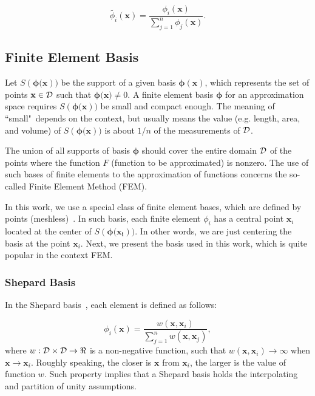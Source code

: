 \begin{equation}
\label{e.normalization}
	\tilde{\phi_i}(\textbf{x})=\frac{\phi_i(\textbf{x})}{\sum_{j=1}^n\phi_j(\textbf{x})}.
\end{equation}

\subsection{Finite Element Basis}
\label{ss.basis}

Let $S(\mathbf{\phi(\textbf{x}}))$ be the support of a given basis $\mathbf{\phi(\textbf{x})}$, which represents the set of points $\textbf{x}\in{\cal D}$ such that $\mathbf{\phi(\textbf{x}})\neq 0$. A finite element basis $\mathbf{\phi}$ for an approximation space requires $S(\mathbf{\phi(\textbf{x}}))$ be small and compact enough. The meaning of ``small"\ depends on the context, but usually means the value (e.g. length, area, and volume) of $S(\mathbf{\phi(\textbf{x}}))$ is about $1/n$ of the measurements of ${\cal D}$.

The union of all supports of basis $\mathbf{\phi}$ should cover the entire domain ${\cal D}$ of the points where the function $F$ (function to be approximated) is nonzero. The use of such bases of finite elements to the approximation of functions concerns the so-called Finite Element Method (FEM).

In this work, we use a special class of finite element bases, which are defined by points (meshless)~\cite{Lehtinen:08,Pereira:10}. In such basis, each finite element $\phi_i$ has a central point $\textbf{x}_i$ located at the center of $S(\mathbf{\phi(\textbf{x}_i}))$. In other words, we are just centering the basis at the point $\textbf{x}_i$. Next, we present the basis used in this work, which is quite popular in the context FEM.

\subsubsection{Shepard Basis}
\label{sss.shepard}

In the Shepard basis~\cite{Shepard:68}, each element is defined as follows:

\begin{equation}
\label{eq.shepard_basis}
	\phi_i(\textbf{x}) = \frac{w(\textbf{x},\textbf{x}_i)}{\sum_{j=1}^nw(\textbf{x},\textbf{x}_j)},
\end{equation}
where $w:{\cal D}\times{\cal D}\rightarrow\Re$ is a non-negative function, such that $w(\textbf{x},\textbf{x}_i)\rightarrow\infty$ when $\textbf{x}\rightarrow\textbf{x}_i$. Roughly speaking, the closer is $\textbf{x}$ from $\textbf{x}_i$, the larger is the value of function $w$. Such property implies that a Shepard basis holds the interpolating and partition of unity assumptions.

